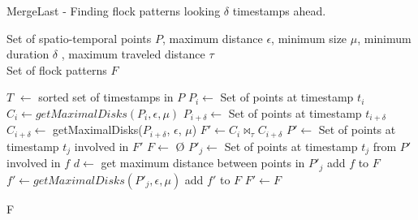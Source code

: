 \documentclass[12pt]{scrartcl}
\begin{document}
\renewcommand{\algorithmicrequire}{\textbf{Input:}}
\renewcommand{\algorithmicensure}{\textbf{Output:}}
\renewcommand{\algorithmicforall}{\textbf{for each}}

\begin{algorithm}
  \footnotesize
  \caption{MergeLast - Finding flock patterns looking $\delta$ timestamps ahead.}
  \label{alg:flockfindermergelast}
  \begin{algorithmic}
    \REQUIRE 
    Set of spatio-temporal points $P$, maximum distance $\epsilon$, minimum size $\mu$, minimum duration $\delta$ , maximum traveled distance $\tau$ \\

    \ENSURE 
    Set of flock patterns $F$ 
    
    $T$ $\leftarrow$ sorted set of timestamps in $P$
		\STATE $P_i \leftarrow$ Set of points at timestamp $t_i$
		\STATE $C_i \leftarrow getMaximalDisks(P_i, \epsilon, \mu)$
		\STATE $P_{i+\delta} \leftarrow$ Set of points at timestamp $t_{i+\delta}$
		\STATE $C_{i+\delta} \leftarrow$ getMaximalDisks($P_{i+\delta}$, $\epsilon$, $\mu$)
        	\STATE $F' \leftarrow C_i \Join_{\tau} C_{i+\delta}$  
			\STATE $P' \leftarrow $ Set of points at timestamp $t_j$ involved in $F'$ 
				\STATE $F \leftarrow $ \O{}
					\STATE $P'_j \leftarrow $ Set of points at timestamp $t_j$ from $P'$ involved in $f$
					\STATE $d \leftarrow $ get maximum distance between points in $P'_j$
						\STATE add $f$ to $F$
					\ELSE
						\STATE $f' \leftarrow getMaximalDisks(P'_j, \epsilon, \mu)$
						\STATE add $f'$ to $F$
					\ENDIF
				\ENDFOR
				\STATE $F' \leftarrow F$
        	\ENDFOR
		\ENDIF
    \ENDFOR
	
	\RETURN F
  \end{algorithmic}
\end{algorithm}

\clearpage
\end{document}

